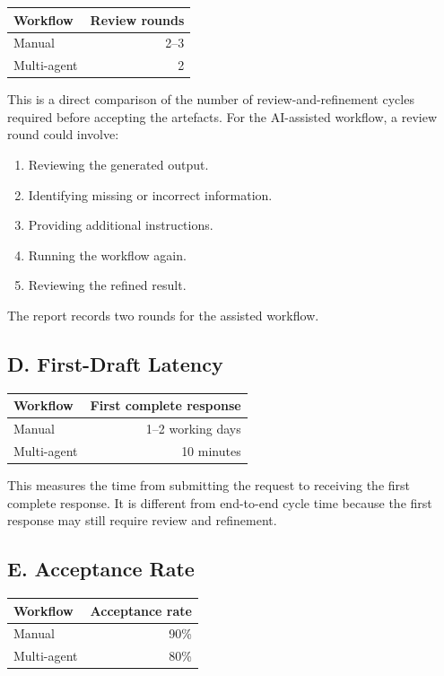 \documentclass[11pt,a4paper]{article}
\begin{document}
\begin{center}
\begin{tabular}{lr}
\toprule
\textbf{Workflow} & \textbf{Review rounds}\\
\midrule
Manual & 2--3\\
Multi-agent & 2\\
\bottomrule
\end{tabular}
\end{center}

This is a direct comparison of the number of review-and-refinement cycles required before accepting the artefacts. For the AI-assisted workflow, a review round could involve:
\begin{enumerate}
  \item Reviewing the generated output.
  \item Identifying missing or incorrect information.
  \item Providing additional instructions.
  \item Running the workflow again.
  \item Reviewing the refined result.
\end{enumerate}
The report records two rounds for the assisted workflow.

\subsection{D. First-Draft Latency}

\begin{center}
\begin{tabular}{lr}
\toprule
\textbf{Workflow} & \textbf{First complete response}\\
\midrule
Manual & 1--2 working days\\
Multi-agent & 10 minutes\\
\bottomrule
\end{tabular}
\end{center}

This measures the time from submitting the request to receiving the first complete response. It is different from end-to-end cycle time because the first response may still require review and refinement.

\subsection{E. Acceptance Rate}

\begin{center}
\begin{tabular}{lr}
\toprule
\textbf{Workflow} & \textbf{Acceptance rate}\\
\midrule
Manual & 90\%\\
Multi-agent & 80\%\\
\bottomrule
\end{tabular}
\end{center}
\end{document}
